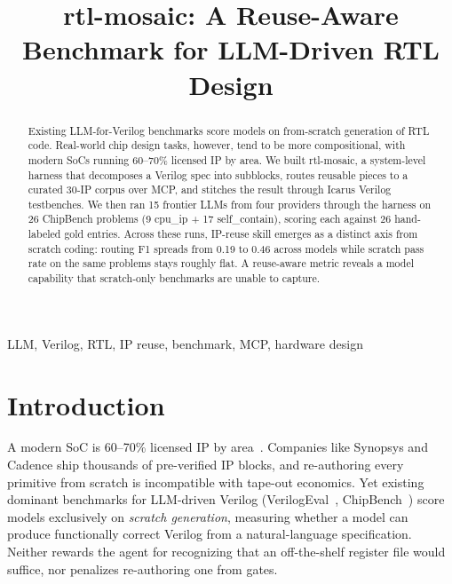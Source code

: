 \documentclass[conference]{IEEEtran}
\begin{document}
\title{rtl-mosaic: A Reuse-Aware Benchmark for LLM-Driven RTL Design}

\author{
}

\maketitle

\begin{abstract}
Existing LLM-for-Verilog benchmarks score models on from-scratch generation of RTL code. Real-world chip design tasks, however, tend to be more compositional, with modern SoCs running 60--70\% licensed IP by area. We built rtl-mosaic, a system-level harness that decomposes a Verilog spec into subblocks, routes reusable pieces to a curated 30-IP corpus over MCP, and stitches the result through Icarus Verilog testbenches. We then ran 15 frontier LLMs from four providers through the harness on 26 ChipBench problems (9 cpu\_ip + 17 self\_contain), scoring each against 26 hand-labeled gold entries. Across these runs, IP-reuse skill emerges as a distinct axis from scratch coding: routing F1 spreads from 0.19 to 0.46 across models while scratch pass rate on the same problems stays roughly flat. A reuse-aware metric reveals a model capability that scratch-only benchmarks are unable to capture.
\end{abstract}

\begin{IEEEkeywords}
LLM, Verilog, RTL, IP reuse, benchmark, MCP, hardware design
\end{IEEEkeywords}

\section{Introduction}

A modern SoC is 60--70\% licensed IP by area~\cite{semico-ip-share}. Companies like Synopsys and Cadence ship thousands of pre-verified IP blocks, and re-authoring every primitive from scratch is incompatible with tape-out economics. Yet existing dominant benchmarks for LLM-driven Verilog (VerilogEval~\cite{verilogeval}, ChipBench~\cite{chipbench}) score models exclusively on \emph{scratch generation}, measuring whether a model can produce functionally correct Verilog from a natural-language specification. Neither rewards the agent for recognizing that an off-the-shelf register file would suffice, nor penalizes re-authoring one from gates.
\end{document}
